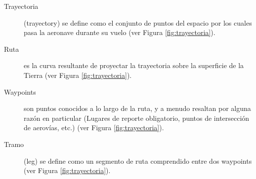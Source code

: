 \documentclass[a4paper,12pt,twoside]{article}
\begin{document}
\begin{description}

\item [Trayectoria] (trayectory) se define como el conjunto de puntos del espacio por los cuales pasa la aeronave durante su vuelo (ver Figura \ref{fig:trayectoria}).

\item [Ruta] es la curva resultante de proyectar la trayectoria sobre la superficie de la Tierra (ver Figura \ref{fig:trayectoria}).

\item [Waypoints] son puntos conocidos a lo largo de la ruta, y a menudo resaltan por alguna raz\'on en particular (Lugares de reporte obligatorio, puntos de intersecci\'on de aerov\'ias, etc.) (ver Figura \ref{fig:trayectoria}).

\item [Tramo] (leg) se define como un segmento de ruta comprendido entre dos waypoints (ver Figura \ref{fig:trayectoria}). 

\begin{figure}[!h]
  \centering


\end{figure}
\end{description}
\end{document}
